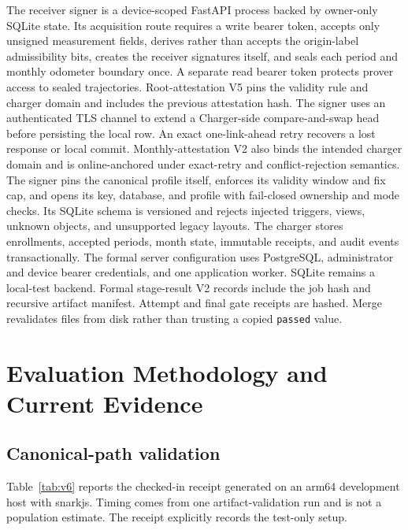 \documentclass[conference]{IEEEtran}
\theoremstyle{plain}
\theoremstyle{definition}
\begin{document}
The receiver signer is a device-scoped FastAPI process backed by owner-only
SQLite state. Its acquisition route requires a write bearer token, accepts only
unsigned measurement fields, derives rather than accepts the origin-label admissibility
bits, creates the receiver signatures itself, and seals each period and monthly
odometer boundary once. A separate read bearer token protects prover access to
sealed trajectories. Root-attestation V5 pins the validity rule and charger
domain and includes the previous attestation hash. The signer uses an
authenticated TLS channel to extend a Charger-side compare-and-swap head before
persisting the local row. An exact one-link-ahead retry recovers a lost response
or local commit. Monthly-attestation V2 also binds the intended charger domain
and is online-anchored under exact-retry and conflict-rejection semantics.
The signer pins the canonical profile itself, enforces its validity window and
fix cap, and opens its key, database, and profile with fail-closed ownership and
mode checks. Its SQLite schema is versioned and rejects injected triggers,
views, unknown objects, and unsupported legacy layouts. The charger stores
enrollments, accepted periods, month state, immutable receipts, and audit
events transactionally. The formal server configuration uses PostgreSQL,
administrator and device bearer credentials, and one application worker.
SQLite remains a local-test backend.
Formal stage-result V2 records include the job hash and recursive artifact
manifest. Attempt and final gate receipts are hashed. Merge revalidates files
from disk rather than trusting a copied \texttt{passed} value.

\section{Evaluation Methodology and Current Evidence}

\subsection{Canonical-path validation}

Table~\ref{tab:v6} reports the checked-in receipt generated on an arm64
development host with snarkjs. Timing comes from one artifact-validation run
and is not a population estimate. The receipt explicitly records the test-only
setup.
\end{document}
